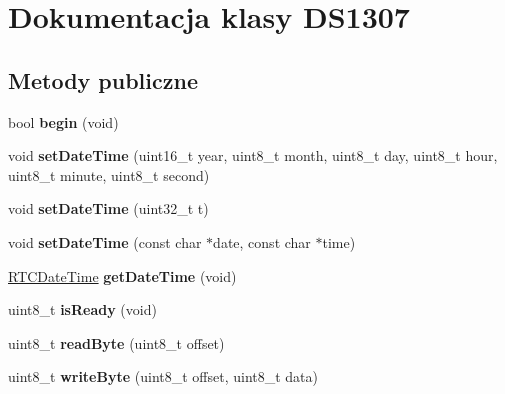 \hypertarget{class_d_s1307}{}\section{Dokumentacja klasy D\+S1307}
\label{class_d_s1307}
\subsection*{Metody publiczne}
\begin{DoxyCompactItemize}
\item 
\mbox{\label{class_d_s1307_a0c5026cdfc7b99c4b86d5706823d06f5}} 
bool {\bfseries begin} (void)
\item 
\mbox{\label{class_d_s1307_a41f8a39e0873497f2c52a22a7ee4b035}} 
void {\bfseries set\+Date\+Time} (uint16\+\_\+t year, uint8\+\_\+t month, uint8\+\_\+t day, uint8\+\_\+t hour, uint8\+\_\+t minute, uint8\+\_\+t second)
\item 
\mbox{\label{class_d_s1307_aa57b265cf323b83e075aeacdd8090255}} 
void {\bfseries set\+Date\+Time} (uint32\+\_\+t t)
\item 
\mbox{\label{class_d_s1307_a5fcb3534f8e78b9708bdcdb9f9172a77}} 
void {\bfseries set\+Date\+Time} (const char $\ast$date, const char $\ast$time)
\item 
\mbox{\label{class_d_s1307_a4ecdf443aebb087395092fe75478fbfd}} 
\hyperlink{struct_r_t_c_date_time}{R\+T\+C\+Date\+Time} {\bfseries get\+Date\+Time} (void)
\item 
\mbox{\label{class_d_s1307_ae9fc5a21eaad48a15cb13068c153e1a1}} 
uint8\+\_\+t {\bfseries is\+Ready} (void)
\item 
\mbox{\label{class_d_s1307_a6c39c52cd1b0a895f2acaff6a548e0da}} 
uint8\+\_\+t {\bfseries read\+Byte} (uint8\+\_\+t offset)
\item 
\mbox{\label{class_d_s1307_a24660dcf3ede47d572e6608d2148feb9}} 
uint8\+\_\+t {\bfseries write\+Byte} (uint8\+\_\+t offset, uint8\+\_\+t data)
\item 
\mbox{\label{class_d_s1307_acd017bd5e0f87e851b69a3cb46a56468}} 

\end{DoxyCompactItemize}
